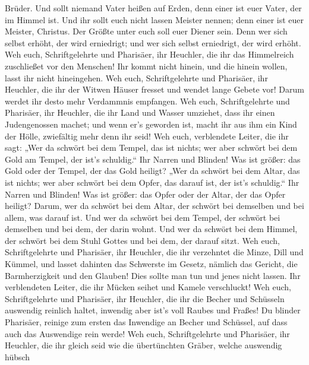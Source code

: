 Brüder.  Und sollt niemand Vater heißen auf Erden, denn
einer ist euer Vater, der im Himmel ist.  Und ihr sollt
euch nicht lassen Meister nennen; denn einer ist euer Meister, Christus.
 Der Größte unter euch soll euer Diener sein. 
Denn wer sich selbst erhöht, der wird erniedrigt; und wer sich selbst
erniedrigt, der wird erhöht.  Weh euch, Schriftgelehrte und
Pharisäer, ihr Heuchler, die ihr das Himmelreich zuschließet vor den
Menschen! Ihr kommt nicht hinein, und die hinein wollen, lasst ihr nicht
hineingehen.  Weh euch, Schriftgelehrte und Pharisäer, ihr
Heuchler, die ihr der Witwen Häuser fresset und wendet lange Gebete vor!
Darum werdet ihr desto mehr Verdammnis empfangen.  Weh
euch, Schriftgelehrte und Pharisäer, ihr Heuchler, die ihr Land und
Wasser umziehet, dass ihr einen Judengenossen machet; und wenn er's
geworden ist, macht ihr aus ihm ein Kind der Hölle, zwiefältig mehr denn
ihr seid!  Weh euch, verblendete Leiter, die ihr sagt: „Wer
da schwört bei dem Tempel, das ist nichts; wer aber schwört bei dem Gold
am Tempel, der ist's schuldig.``  Ihr Narren und Blinden!
Was ist größer: das Gold oder der Tempel, der das Gold heiligt?
 „Wer da schwört bei dem Altar, das ist nichts; wer aber
schwört bei dem Opfer, das darauf ist, der ist's schuldig.``
 Ihr Narren und Blinden! Was ist größer: das Opfer oder der
Altar, der das Opfer heiligt?  Darum, wer da schwört bei
dem Altar, der schwört bei demselben und bei allem, was darauf ist.
 Und wer da schwört bei dem Tempel, der schwört bei
demselben und bei dem, der darin wohnt.  Und wer da schwört
bei dem Himmel, der schwört bei dem Stuhl Gottes und bei dem, der darauf
sitzt.  Weh euch, Schriftgelehrte und Pharisäer, ihr
Heuchler, die ihr verzehntet die Minze, Dill und Kümmel, und lasset
dahinten das Schwerste im Gesetz, nämlich das Gericht, die
Barmherzigkeit und den Glauben! Dies sollte man tun und jenes nicht
lassen.  Ihr verblendeten Leiter, die ihr Mücken seihet und
Kamele verschluckt!  Weh euch, Schriftgelehrte und
Pharisäer, ihr Heuchler, die ihr die Becher und Schüsseln auswendig
reinlich haltet, inwendig aber ist's voll Raubes und Fraßes!
 Du blinder Pharisäer, reinige zum ersten das Inwendige an
Becher und Schüssel, auf dass auch das Auswendige rein werde!
 Weh euch, Schriftgelehrte und Pharisäer, ihr Heuchler, die
ihr gleich seid wie die übertünchten Gräber, welche auswendig hübsch
